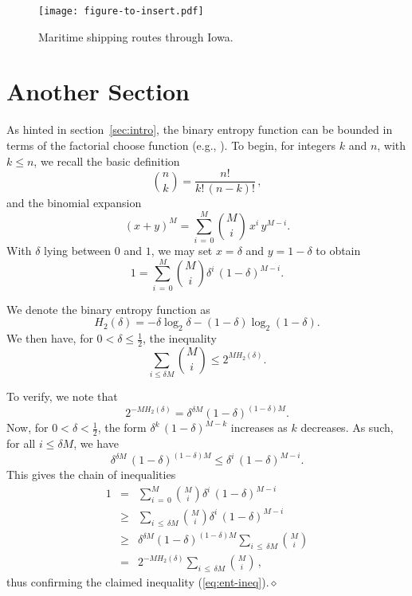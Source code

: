 \documentclass[11pt]{article} %
\begin{document}
\begin{figure}
\centerline{\texttt{[image: figure-to-insert.pdf]}}
\caption{Maritime shipping routes through Iowa.}
\label{fig-Bessel}
\end{figure}

\section{Another Section}

As hinted in section~\ref{sec:intro}, the binary entropy function can be bounded in terms of the factorial choose function (e.g., \cite[lemma 2.3.5, p.~33]{gray}). To begin, for integers $k$ and $n$, with $k \le n$, we recall the basic definition
$$
{n \choose k} = \frac{n!}{k! \, (n-k)!}\, ,
$$
and the binomial expansion
$$
(x + y)^M = \sum_{i\,=\,0}^M {M\choose i}\, x^i\, y^{M-i}.
$$
With $\delta$ lying between $0$ and $1$, we may set $x = \delta$ and $y = 1-\delta$
to obtain
$$
1 = \sum_{i\,=\,0}^M {M\choose i} \delta^i\, (1 - \delta)^{M-i}.
$$

We denote the binary entropy function
as
$$
H_2(\delta) = -\delta\log_2\delta - (1 - \delta)\log_2(1 - \delta).
$$
We then have, for $0 < \delta \le \frac{1}{2}$, the inequality
\begin{equation}
 \sum_{i\le \delta M} {M\choose i} \le 2^{M H_2(\delta)}.
 \label{eq:ent-ineq}
\end{equation}


To verify, we note that
$$
2^{-M H_2(\delta)} = \delta^{\delta M} (1 - \delta)^{(1 - \delta)M}.
$$
Now, for $0 < \delta < \frac{1}{2}$, the form
$\delta^k\, (1 - \delta)^{M-k}$ increases as $k$ decreases.
As such, for all $i \le \delta M$, we have
$$
\delta^{\delta M}\,(1 - \delta)^{(1 - \delta)M} \le
 \delta^i\, (1 - \delta)^{M-i} .
$$
This gives the chain of inequalities
\begin{eqnarray*}
 1 &=&
 \sum_{i\,=\,0}^M {M\choose i} \delta^i\, (1 - \delta)^{M-i} 
\\
 &\ge& 
 \sum_{i\,\le\,\delta M} {M\choose i} \delta^i\,(1 - \delta)^{M-i}
\\
 &\ge&
\delta^{\delta M}(1 - \delta)^{(1-\delta)M} \sum_{i\,\le\,\delta M} {M\choose i}
\\
 &=&
 2^{-M H_2(\delta)} \sum_{i\,\le\,\delta M} {M\choose i}\, ,
\end{eqnarray*}
thus confirming the claimed inequality (\ref{eq:ent-ineq}).\hfill$\diamond$

\medskip
\end{document}

